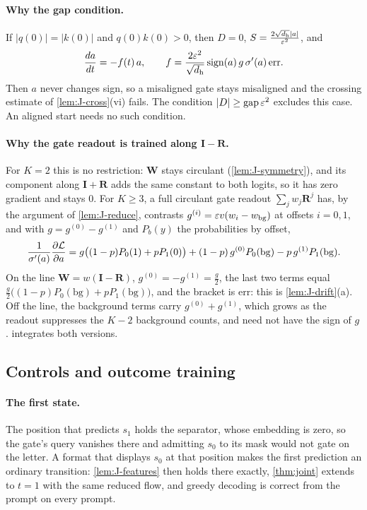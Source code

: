 \paragraph{Why the gap condition.}\label{rem:J-balance} If $|q(0)|=|k(0)|$ and $q(0)k(0)>0$, then $D=0$, $S=\frac{2\sqrt{d_{\mathrm h}}|a|}{\varepsilon^2}$, and
\[
 \ddt{a}=-f(t)\,a,\qquad f=\frac{2\initscale^2}{\sqrt{d_{\mathrm h}}}\operatorname{sign}(a)\,g\,\sigma'(a)\,\mathrm{err} .
\]
Then $a$ never changes sign, so a misaligned gate stays misaligned and the crossing estimate of \cref{lem:J-cross}(vi) fails. The condition
$|D|\ge\mathrm{gap}\,\varepsilon^2$ excludes this case. An aligned start needs no such condition.

\paragraph{Why the gate readout is trained along $\mathbf I-\mathbf R$.}\label{rem:J-line} For $K=2$ this is no restriction: $\mathbf W$ stays circulant
(\cref{lem:J-symmetry}), and its component along $\mathbf I+\mathbf R$ adds the same constant to both logits, so it has zero gradient and stays $0$.
For $K\ge3$, a full circulant gate readout $\sum_jw_j\mathbf R^j$ has, by the argument of \cref{lem:J-reduce}, contrasts $g^{(i)}=\varepsilon v(w_i-w_{\mathrm{bg}})$
at offsets $i=0,1$, and with $g=g^{(0)}-g^{(1)}$ and $P_b(y)$ the probabilities by offset,
\[
 \frac{1}{\sigma'(a)}\pd{\mathcal L}{a}=g\bigl((1-p)P_0(1)+pP_1(0)\bigr)+(1-p)\,g^{(0)}P_0(\mathrm{bg})-p\,g^{(1)}P_1(\mathrm{bg}).
\]
On the line $\mathbf W=w(\mathbf I-\mathbf R)$, $g^{(0)}=-g^{(1)}=\frac{g}{2}$, the last two terms equal $\frac{g}{2}\bigl((1-p)P_0(\mathrm{bg})+pP_1(\mathrm{bg})\bigr)$, and the bracket is
$\mathrm{err}$: this is \cref{lem:J-drift}(a). Off the line, the background terms carry $g^{(0)}+g^{(1)}$, which grows as the readout suppresses the $K-2$
background counts, and need not have the sign of $g$.  integrates both versions.


\subsection{Controls and outcome training}

\paragraph{The first state.}\label{rem:first-state} The position that predicts $s_1$ holds the separator, whose embedding is zero, so
the gate's query vanishes there and admitting $s_0$ to its mask would not gate on the letter. A format that displays $s_0$ at that
position makes the first prediction an ordinary transition: \cref{lem:J-features} then holds there exactly, \cref{thm:joint} extends to
$t=1$ with the same reduced flow, and greedy decoding is correct from the prompt on every prompt.

